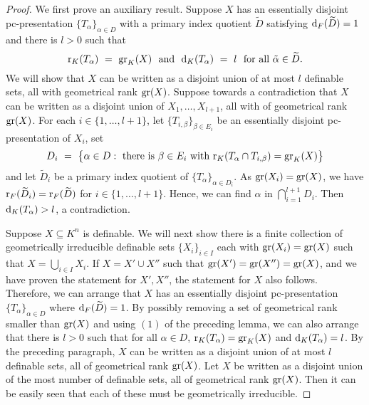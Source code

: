 \begin{proof}
We first prove an auxiliary result. Suppose $X$ has an essentially disjoint pc-presentation $\{ T_\alpha\}_{ \alpha \in D}$  with a primary index  quotient $\widetilde{D}$ satisfying $\mathrm{d}_F( \widetilde{D}) =1$ and there is $l>0$ such that $$\mr_K(T_\alpha)\ =\ \gr_K(X)\ \text{ and }\ \md_K(T_\alpha)\ =\ l\ \text{ for all } \tilde{\alpha} \in \widetilde{D}. $$
We will show that $X$ can be written as a disjoint union of at most $l$  definable sets, all with geometrical rank $\mathrm{gr}(X)$. Suppose towards a contradiction that $X$ can be written as a disjoint union of $ X_1, \ldots, X_{l+1}$, all with of geometrical rank $\mathrm{gr}(X)$. For each $i \in \{1, \ldots, l+1\}$, let $\{ T_{i,\beta}\}_{ \beta \in E_i}$ be an essentially disjoint pc-presentation of $X_i$, set 
$$D_i\ =\ \big\{ \alpha \in D : \text{ there is } \beta \in E_i \text{ with  }\mathrm{r}_K( T_\alpha \cap T_{i,\beta}) = \mathrm{gr}_K(X) \big\}$$  and let $\widetilde{D}_i$ be a primary index quotient of $\{ T_\alpha\}_{ \alpha \in D_i}$. As $\mathrm{gr}(X_i) = \mathrm{gr}(X)$, we have $\mathrm{r}_F(\widetilde{D}_i)=\mathrm{r}_F(\widetilde{D})$ for $i \in \{1, \ldots, l+1\}$. Hence, we can find $\alpha $ in $\bigcap_{i =1}^{l+1} D_i$. Then $\mathrm{d}_K(T_\alpha)> l$, a contradiction.

Suppose $X \subseteq K^n$ is definable. We will next show there is a finite collection of geometrically irreducible definable sets $\{X_i\}_{i \in I}$ each with $\mathrm{gr}(X_i)=\mathrm{gr}(X)$ such that $X = \bigcup_{i \in I} X_i$.
If $X = X' \cup X''$ such that $\mathrm{gr}(X')=\mathrm{gr}(X'') =\mathrm{gr}(X)$, and we have proven the statement for $X', X''$, the statement for $X$ also follows.
Therefore, we can arrange that $X$ has an essentially disjoint pc-presentation $\{ T_\alpha\}_{ \alpha \in D}$ where $\mathrm{d}_F( \widetilde{D}) =1$. 
By possibly removing a set of geometrical rank smaller than $\mathrm{gr}(X)$ and using $(1)$ of the preceding lemma, we can also arrange that there is $l>0$ such that for all $\alpha \in D$,  $\mathrm{r}_K(T_\alpha) =\mathrm{gr}_K(X)$ and $\mathrm{d}_K(T_\alpha)=l$. By the preceding paragraph, $X$ can be written as a disjoint union of at most $l$  definable sets, all of geometrical rank $\mathrm{gr}(X)$. Let $X$ be written as a disjoint union of the most number of definable sets, all of geometrical rank $\mathrm{gr}(X)$. Then it can be easily seen that each of these must be geometrically irreducible.



\end{proof}
